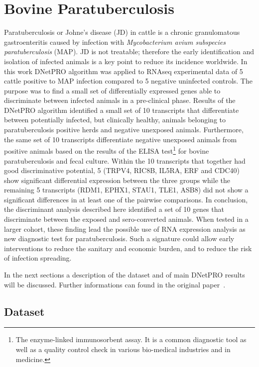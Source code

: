 \documentclass{standalone}
\begin{document}
\section[Bovine Dataset]{Bovine Paratuberculosis}\label{bovine}

Paratuberculosis or Johne's disease (JD) in cattle is a chronic granulomatous gastroenteritis caused by infection with \emph{Mycobacterium avium subspecies paratuberculosis} (MAP).
JD is not treatable; therefore the early identification and isolation of infected animals is a key point to reduce its incidence worldwide.
In this work DNetPRO algorithm was applied to RNAseq experimental data of 5 cattle positive to MAP infection compared to 5 negative uninfected controls.
The purpose was to find a small set of differentially expressed genes able to discriminate between infected animals in a pre-clinical phase.
Results of the DNetPRO algorithm identified a small set of 10 transcripts that differentiate between potentially infected, but clinically healthy, animals belonging to paratuberculosis positive herds and negative unexposed animals.
Furthermore, the same set of 10 transcripts differentiate negative unexposed animals from positive animals based on the results of the ELISA test\footnote{
  The enzyme-linked immunosorbent assay.
  It is a common diagnostic tool as well as a quality control check in various bio-medical industries and in medicine.
} for bovine paratuberculosis and fecal culture.
Within the 10 transcripts that together had good discriminative potential, 5 (TRPV4, RIC8B, IL5RA, ERF and CDC40) show significant differential expression between the three groups while the remaining 5 transcripts (RDM1, EPHX1, STAU1, TLE1, ASB8) did not show a significant differences in at least one of the pairwise comparisons.
In conclusion, the discriminant analysis described here identified a set of 10 genes that discriminate between the exposed and sero-converted animals.
When tested in a larger cohort, these finding lead the possible use of RNA expression analysis as new diagnostic test for paratuberculosis.
Such a signature could allow early interventions to reduce the sanitary and economic burden, and to reduce the risk of infection spreading.

In the next sections a description of the dataset and of main DNetPRO results will be discussed.
Further informations can found in the original paper~\cite{Malvisi2019}.

\subsection[Dataset]{Dataset}\label{bovine_data}
\end{document}
